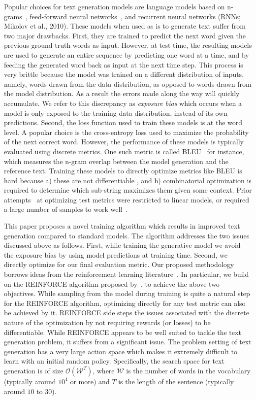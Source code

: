 \documentclass{article} \usepackage{iclr2016_conference,times}
\begin{document}
Popular choices for text generation models are language models based on n-grams~\citep{kneser+ney1995}, feed-forward neural networks~\citep{nlm}, and recurrent neural networks (RNNs; Mikolov et al., 2010)\nocite{mikolov-2010}. These models when used as is to generate text suffer from two major drawbacks. First, they are trained to predict the next word given the previous ground truth words as input. 
However, at test time, the resulting models are used to generate an entire sequence by predicting one word at a time, and by feeding the generated word back as input at the next time step.
This process is very brittle because the model was trained on a different distribution of inputs, namely, words drawn from the data distribution, as opposed to words drawn from the model distribution. As a result the errors made along the way will quickly accumulate.
We refer to this discrepancy as \textit{exposure bias} which occurs when a model is only exposed to the training data distribution, instead of its own predictions. 
Second, the loss function used to train these models is at the word level. A popular choice is the cross-entropy loss used to maximize the probability of the next correct word. However, the performance of these models is typically evaluated using discrete metrics. One such metric is called BLEU~\citep{bleu} for instance, which measures the n-gram overlap between the model generation and the reference text. Training these models to directly optimize metrics like BLEU is hard because a) these are not differentiable \citep{rosti2011}, and b) combinatorial optimization is required to determine which sub-string maximizes them given some context. Prior attempts~\citep{mcallister2010,he12} at optimizing test metrics were restricted to linear models, or required a large number of samples to work well~\citep{auli2014}.

This paper proposes a novel training algorithm which results in improved text generation compared to standard models. The algorithm addresses the two issues discussed above as follows. First, while training the generative model we avoid the exposure bias by using model predictions at training time. Second, we directly optimize for our final evaluation metric. Our proposed methodology borrows ideas from the reinforcement learning literature~\citep{sutton-rl}. In particular, we build on the REINFORCE algorithm proposed by~\citet{reinforce}, to achieve the above two objectives. While sampling from the model during training is quite a natural step for the REINFORCE algorithm, optimizing directly for any test metric can also be achieved by it. REINFORCE side steps the issues associated with the discrete nature of the optimization by not requiring rewards (or losses) to be differentiable. 
While REINFORCE appears to be well suited to tackle the text generation problem, it suffers from a significant issue. 
The problem setting of text generation has a very large action space which makes it extremely difficult to learn with an initial random policy.
Specifically, the search space for text generation is of size $\mathcal{O}(\mathcal{W}^T)$, where  $\mathcal{W}$ is the number of words in the vocabulary (typically around $10^4$ or more) and $T$ is the length of the sentence (typically around $10$ to $30$). 
\end{document}
